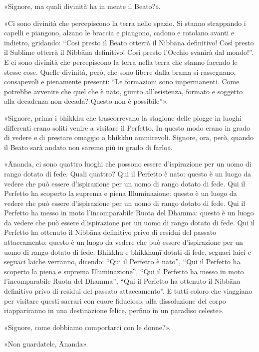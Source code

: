 «Signore, ma quali divinità ha in mente il Beato?».

«Ci sono divinità che percepiscono la terra nello spazio. Si stanno strappando i
capelli e piangono, alzano le braccia e piangono, cadono e rotolano avanti e
indietro, gridando: “Così presto il Beato otterrà il Nibbāna definitivo! Così
presto il Sublime otterrà il Nibbāna definitivo! Così presto l’Occhio svanirà
dal mondo!”. E ci sono divinità che percepiscono la terra nella terra che stanno
facendo le stesse cose. Quelle divinità, però, che sono libere dalla brama si
rassegnano, consapevoli e pienamente presenti: “Le formazioni sono impermanenti.
Come potrebbe avvenire che quel che è nato, giunto all’esistenza, formato e
soggetto alla decadenza non decada? Questo non è possibile”».

«Signore, prima i bhikkhu che trascorrevano la stagione delle piogge in luoghi
differenti erano soliti venire a visitare il Perfetto. In questo modo erano in
grado di vedere e di prestare omaggio a bhikkhu ammirevoli. Signore, ora, però,
quando il Beato sarà andato non saremo più in grado di farlo».

«Ānanda, ci sono quattro luoghi che possono essere d’ispirazione per un uomo di
rango dotato di fede. Quali quattro? Qui il Perfetto è nato: questo è un luogo
da vedere che può essere d’ispirazione per un uomo di rango dotato di fede. Qui
il Perfetto ha scoperto la suprema e piena Illuminazione: questo è un luogo da
vedere che può essere d’ispirazione per un uomo di rango dotato di fede. Qui il
Perfetto ha messo in moto l’incomparabile Ruota del Dhamma: questo è un luogo da
vedere che può essere d’ispirazione per un uomo di rango dotato di fede. Qui il
Perfetto ha ottenuto il Nibbāna definitivo privo di residui del passato
attaccamento: questo è un luogo da vedere che può essere d’ispirazione per un
uomo di rango dotato di fede. Bhikkhu e bhikkhuṇī dotati di fede, seguaci laici
e seguaci laiche verranno, dicendo: “Qui il Perfetto è nato”, “Qui il Perfetto
ha scoperto la piena e suprema Illuminazione”, “Qui il Perfetto ha messo in moto
l’incomparabile Ruota del Dhamma”, “Qui il Perfetto ha ottenuto il Nibbāna
definitivo privo di residui del passato attaccamento”. E tutti coloro che
viaggiano per visitare questi sacrari con cuore fiducioso, alla dissoluzione del
corpo riappariranno in una destinazione felice, perfino in un paradiso celeste».

«Signore, come dobbiamo comportarci con le donne?».

«Non guardatele, Ānanda».

